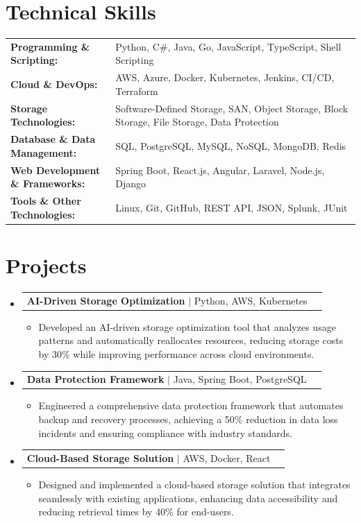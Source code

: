\documentclass[letterpaper,10pt]{article}
\makeatletter
\newcommand{\resumeItem}[1]{
  \item{\fontsize{8pt}{9pt}\selectfont
    #1 \vspace{-3pt}
  }
}
\newcommand{\resumeProjectHeading}[2]{
    \item
    \begin{tabular*}{1.001\textwidth}{l@{\extracolsep{\fill}}r}
      \fontsize{8.5pt}{10pt}#1 & \textbf{\fontsize{8.5pt}{10pt} #2}\\
    \end{tabular*}\vspace{-7pt}
}
\newcommand{\resumeSubHeadingListStart}{\begin{itemize}[leftmargin=0pt, label={}]}
\newcommand{\resumeSubHeadingListEnd}{\end{itemize}}
\newcommand{\resumeItemListStart}{\begin{itemize}[leftmargin=*]}
\newcommand{\resumeItemListEnd}{\end{itemize}\vspace{-5pt}}
\makeatother
\begin{document}
\section{Technical Skills}
        \vspace{-14pt}
        \begin{table}[h]
            \fontsize{8pt}{9pt}\selectfont
            \begin{tabular}{p{0.3\linewidth} p{0.7\linewidth}}
                \textbf{Programming \& Scripting:} & Python, C\#, Java, Go, JavaScript, TypeScript, Shell Scripting \\
                \textbf{Cloud \& DevOps:} & AWS, Azure, Docker, Kubernetes, Jenkins, CI/CD, Terraform \\
                \textbf{Storage Technologies:} & Software-Defined Storage, SAN, Object Storage, Block Storage, File Storage, Data Protection \\
                \textbf{Database \& Data Management:} & SQL, PostgreSQL, MySQL, NoSQL, MongoDB, Redis \\
                \textbf{Web Development \& Frameworks:} & Spring Boot, React.js, Angular, Laravel, Node.js, Django \\
                \textbf{Tools \& Other Technologies:} & Linux, Git, GitHub, REST API, JSON, Splunk, JUnit \\
            \end{tabular}
        \end{table}
 \vspace{-18pt}

\section{Projects}
    \vspace{-5pt}
    \resumeSubHeadingListStart
          \resumeProjectHeading
            {\textbf{AI-Driven Storage Optimization} $|$ Python, AWS, Kubernetes}{}
            \resumeItemListStart
                \resumeItem{Developed an AI-driven storage optimization tool that analyzes usage patterns and automatically reallocates resources, reducing storage costs by 30\% while improving performance across cloud environments.}
            \resumeItemListEnd
        \vspace{-12pt}
    
        \resumeProjectHeading
            {\textbf{Data Protection Framework} $|$ Java, Spring Boot, PostgreSQL}{}
        \resumeItemListStart
                \resumeItem{Engineered a comprehensive data protection framework that automates backup and recovery processes, achieving a 50\% reduction in data loss incidents and ensuring compliance with industry standards.}
        \resumeItemListEnd
      \vspace{-12pt}
      \resumeProjectHeading
        {\textbf{Cloud-Based Storage Solution} $|$ AWS, Docker, React}{}
    \resumeItemListStart
            \resumeItem{Designed and implemented a cloud-based storage solution that integrates seamlessly with existing applications, enhancing data accessibility and reducing retrieval times by 40\% for end-users.}
    \resumeItemListEnd
    \resumeSubHeadingListEnd
\end{document}
